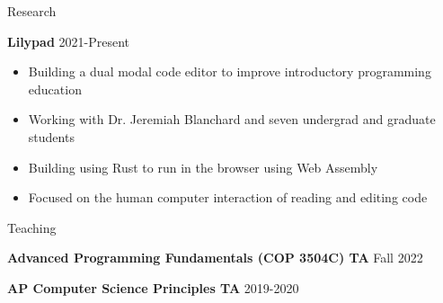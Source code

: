 \documentclass{resume}
\begin{document}
\begin{rSection}{Research}
\vspace{-1.25em}

\item \textbf{Lilypad} {2021-Present}
\begin{itemize}
    \itemsep -3pt {} 
    \vspace{-0.35em}
    \item Building a dual modal code editor to improve introductory programming education
    \item Working with Dr. Jeremiah Blanchard and seven undergrad and graduate students
    \item Building using Rust to run in the browser using Web Assembly
    \item Focused on the human computer interaction of reading and editing code
\end{itemize}

\end{rSection} 

\begin{rSection}{Teaching}
\vspace{-1.25em}

\item \textbf{Advanced Programming Fundamentals (COP 3504C) TA} \hfill {Fall 2022}
\item \textbf{AP Computer Science Principles TA} \hfill {2019-2020}

\end{rSection} 
\end{document}
